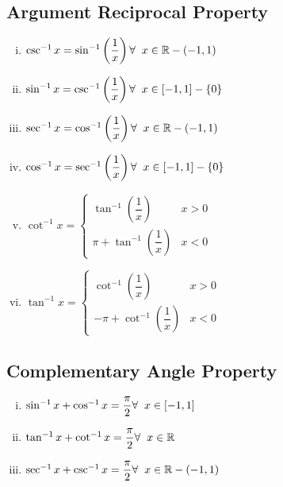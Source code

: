 \documentclass{article}
\begin{document}
\subsection{Argument Reciprocal Property}
\begin{enumerate}[i.]
    \item $\csc^{-1}x=\sin^{-1}\left(\dfrac{1}{x}\right) \hfill \forall \hspace{2mm} x \in \mathbb{R}-(-1,1)$
    \item $\sin^{-1}x=\csc^{-1}\left(\dfrac{1}{x}\right) \hfill \forall \hspace{2mm} x \in [-1,1]-\left\{0\right\}$
    \item $\sec^{-1}x=\cos^{-1}\left(\dfrac{1}{x}\right) \hfill \forall \hspace{2mm} x \in \mathbb{R}-(-1,1)$
    \item $\cos^{-1}x=\sec^{-1}\left(\dfrac{1}{x}\right) \hfill \forall \hspace{2mm} x \in [-1,1]-\left\{0\right\}$
    \item $\cot^{-1}x=\begin{cases}
        \tan^{-1}\left(\dfrac{1}{x}\right) & x > 0 \\
        \pi + \tan^{-1}\left(\dfrac{1}{x}\right) & x<0
    \end{cases}$
    \item $\tan^{-1}x=\begin{cases}
        \cot^{-1}\left(\dfrac{1}{x}\right) & x>0 \\
        -\pi + \cot^{-1}\left(\dfrac{1}{x}\right) & x<0
    \end{cases}$
\end{enumerate}

\subsection{Complementary Angle Property}
\begin{enumerate}[i.]
    \item $\sin^{-1}x+\cos^{-1}x=\dfrac{\pi}{2} \hfill \forall \hspace{2mm} x \in [-1,1] $
    \item $\tan^{-1}x+\cot^{-1}x=\dfrac{\pi}{2} \hfill \forall \hspace{2mm} x \in \mathbb{R} $
    \item $\sec^{-1}x+\csc^{-1}x=\dfrac{\pi}{2} \hfill \forall \hspace{2mm} x \in \mathbb{R}-(-1,1) $
\end{enumerate}
\end{document}

